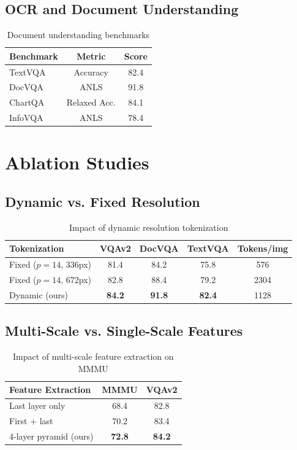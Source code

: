 \documentclass[11pt,a4paper]{article}
\begin{document}
\subsection{OCR and Document Understanding}

\begin{table}[H]
\centering
\caption{Document understanding benchmarks}
\label{tab:ocr}
\begin{tabular}{lcc}
\toprule
Benchmark & Metric & Score \\
\midrule
TextVQA & Accuracy & 82.4 \\
DocVQA & ANLS & 91.8 \\
ChartQA & Relaxed Acc. & 84.1 \\
InfoVQA & ANLS & 78.4 \\
\bottomrule
\end{tabular}
\end{table}

\section{Ablation Studies}

\subsection{Dynamic vs. Fixed Resolution}

\begin{table}[H]
\centering
\caption{Impact of dynamic resolution tokenization}
\label{tab:ablation_res}
\begin{tabular}{lcccc}
\toprule
Tokenization & VQAv2 & DocVQA & TextVQA & Tokens/img \\
\midrule
Fixed ($p=14$, 336px) & 81.4 & 84.2 & 75.8 & 576 \\
Fixed ($p=14$, 672px) & 82.8 & 88.4 & 79.2 & 2304 \\
Dynamic (ours) & \textbf{84.2} & \textbf{91.8} & \textbf{82.4} & 1128 \\
\bottomrule
\end{tabular}
\end{table}

\subsection{Multi-Scale vs. Single-Scale Features}

\begin{table}[H]
\centering
\caption{Impact of multi-scale feature extraction on MMMU}
\label{tab:ablation_scale}
\begin{tabular}{lcc}
\toprule
Feature Extraction & MMMU & VQAv2 \\
\midrule
Last layer only & 68.4 & 82.8 \\
First + last & 70.2 & 83.4 \\
4-layer pyramid (ours) & \textbf{72.8} & \textbf{84.2} \\
\bottomrule
\end{tabular}
\end{table}
\end{document}
